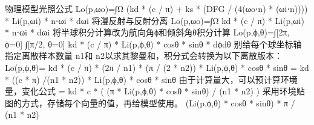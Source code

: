 
物理模型光照公式
Lo(p,ωo)=∫Ω (kd * (c / π) + ks * (DFG / (4(ωo⋅n) * (ωi⋅n)))) * Li(p,ωi) * n⋅ωi * dωi
将漫反射与反射分离
Lo(p,ωo)=∫Ω kd * (c / π) * Li(p,ωi) * n⋅ωi * dωi
将半球积分计算改为航向角ϕ和倾斜角θ积分计算 
Lo(p,ϕ,θ)=∫[2π, ϕ=0] ∫[π/2, θ=0] kd * (c / π) * Li(p,ϕ,θ) * cosθ * sinθ * dϕdθ
别给每个球坐标轴指定离散样本数量 n1和 n2以求其黎曼和，积分式会转换为以下离散版本：
Lo(p,ϕ,θ)= kd * (c / π) * (2π / n1) * (π / (2 * n2)) * Li(p,ϕ,θ) * cosθ * sinθ
         = kd * ((c * π) /(n1 * n2)) * Li(p,ϕ,θ) * cosθ * sinθ
由于计算量大，可以预计算环境量，变化公式
         = kd * c * ( (π * Li(p,ϕ,θ) * cosθ * sinθ) / (n1 * n2) )
采用环境贴图的方式，存储每个向量的值，再给模型使用。
  (Li(p,ϕ,θ) * cosθ * sinθ) * π / (n1 * n2)

